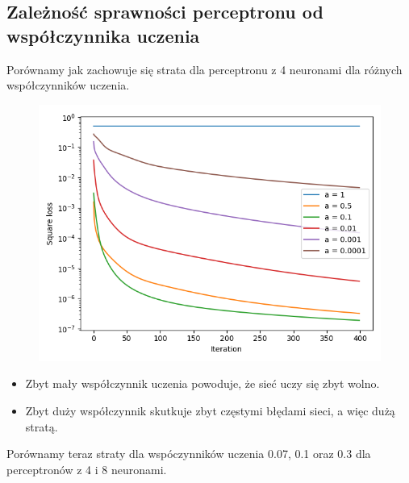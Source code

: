 \documentclass[12pt,a4paper]{article}
\begin{document}
\pagebreak

\subsection{Zależność sprawności perceptronu od współczynnika uczenia}

Porównamy jak zachowuje się strata dla perceptronu z 4 neuronami dla różnych współczynników uczenia.

\begin{figure}[h]
  \centering
  \includegraphics[width=\linewidth]{charts/learning_rates/4neurons.png}
  \caption{}
  \label{}
\end{figure}

\begin{itemize}
  \item   Zbyt mały współczynnik uczenia powoduje, że sieć uczy się zbyt wolno.
  \item   Zbyt duży współczynnik skutkuje zbyt częstymi błędami sieci, a więc dużą stratą.
\end{itemize}

\pagebreak

Porównamy teraz straty dla wspóczynników uczenia 0.07, 0.1 oraz 0.3 dla perceptronów z 4 i 8 neuronami.
\end{document}
